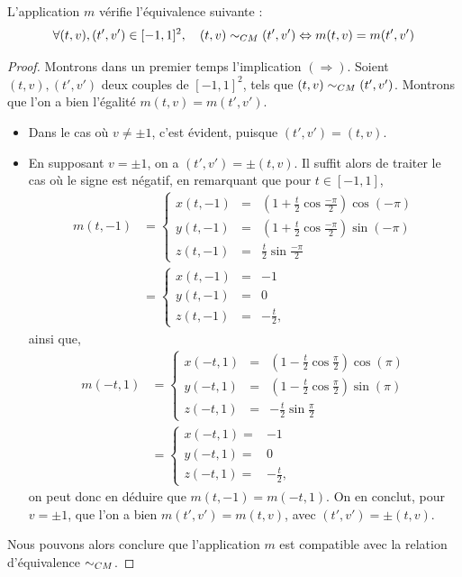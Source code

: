 \documentclass[hidelinks, 10pt]{article}
\begin{document}
\begin{proposition}\label{prop:mobius-equiv}
L'application $m$ vérifie l'équivalence suivante : \begin{equation*}
\forall(t,v),(t',v')\in[-1,1]^2,\quad (t,v)\sim_{CM}(t',v')\Leftrightarrow m(t,v)=m(t',v')
\end{equation*}
\end{proposition}
\begin{proof}
Montrons dans un premier temps l'implication $(\Rightarrow)$. Soient $(t,v),(t',v')$ deux couples de $[-1,1]^2$, tels que $(t,v)\sim_{CM}(t',v')$. Montrons que l'on a bien l'égalité $m(t,v)=m(t',v')$.\begin{itemize}
    \item Dans le cas où $v\neq\pm1$, c'est évident, puisque $(t',v')=(t,v)$.

    \item En supposant $v=\pm1$, on a $(t',v')=\pm(t,v)$. Il suffit alors de traiter le cas où le signe est négatif, en remarquant que pour $t\in[-1,1]$, \[\begin{split}
m(t,-1)&=\left\{\begin{matrix}
x(t,-1)&=&\left(1+\frac{t}{2}\cos\frac{-\pi}{2} \right )\cos(-\pi)\\ 
y(t,-1)&=&\left(1+\frac{t}{2}\cos\frac{-\pi}{2} \right )\sin(-\pi)\\ 
z(t,-1)&=&\frac{t}{2}\sin\frac{-\pi}{2}
\end{matrix}\right.\\
&=\left\{\begin{matrix}
x(t,-1)&=&-1\\ 
y(t,-1)&=&0\\ 
z(t,-1)&=&-\frac{t}{2},
\end{matrix}\right.
\end{split}\]ainsi que, \[\begin{split}
m(-t,1)&=\left\{\begin{matrix}
x(-t,1)&=&\left(1-\frac{t}{2}\cos\frac{\pi}{2} \right )\cos(\pi)\\ 
y(-t,1)&=&\left(1-\frac{t}{2}\cos\frac{\pi}{2} \right )\sin(\pi)\\ 
z(-t,1)&=&-\frac{t}{2}\sin\frac{\pi}{2}
\end{matrix}\right.\\
&=\left\{\begin{matrix}
x(-t,1)=&-1\\ 
y(-t,1)=&0\\ 
z(-t,1)=&-\frac{t}{2},
\end{matrix}\right.
\end{split}\]on peut donc en déduire que $m(t,-1)=m(-t,1)$. On en conclut, pour $v=\pm1$, que l'on a bien $m(t',v')=m(t,v)$, avec $(t', v')=\pm(t,v)$.
\end{itemize}
Nous pouvons alors conclure que l'application $m$ est compatible avec la relation d'équivalence $\sim_{CM}$.


\end{proof}
\end{document}
